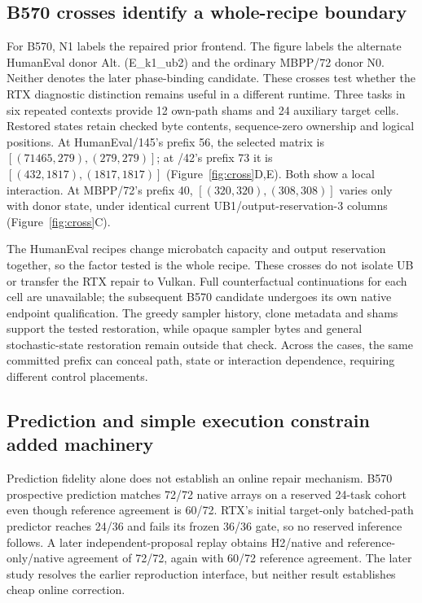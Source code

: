\subsection{B570 crosses identify a whole-recipe boundary}
For B570, N1 labels the repaired prior frontend. The figure labels the alternate HumanEval donor Alt. (E\_k1\_ub2) and the ordinary MBPP/72 donor N0. Neither denotes the later phase-binding candidate. These crosses test whether the RTX diagnostic distinction remains useful in a different runtime. Three tasks in six repeated contexts provide 12 own-path shams and 24 auxiliary target cells. Restored states retain checked byte contents, sequence-zero ownership and logical positions. At HumanEval/145's prefix 56, the selected matrix is $[(71465,279),(279,279)]$; at /42's prefix 73 it is $[(432,1817),(1817,1817)]$ (Figure~\ref{fig:cross}D,E). Both show a local interaction. At MBPP/72's prefix 40, $[(320,320),(308,308)]$ varies only with donor state, under identical current UB1/output-reservation-3 columns (Figure~\ref{fig:cross}C).

The HumanEval recipes change microbatch capacity and output reservation together, so the factor tested is the whole recipe. These crosses do not isolate UB or transfer the RTX repair to Vulkan. Full counterfactual continuations for each cell are unavailable; the subsequent B570 candidate undergoes its own native endpoint qualification. The greedy sampler history, clone metadata and shams support the tested restoration, while opaque sampler bytes and general stochastic-state restoration remain outside that check. Across the cases, the same committed prefix can conceal path, state or interaction dependence, requiring different control placements.

\subsection{Prediction and simple execution constrain added machinery}
Prediction fidelity alone does not establish an online repair mechanism. B570 prospective prediction matches 72/72 native arrays on a reserved 24-task cohort even though reference agreement is 60/72. RTX's initial target-only batched-path predictor reaches 24/36 and fails its frozen 36/36 gate, so no reserved inference follows. A later independent-proposal replay obtains H2/native and reference-only/native agreement of 72/72, again with 60/72 reference agreement. The later study resolves the earlier reproduction interface, but neither result establishes cheap online correction.

